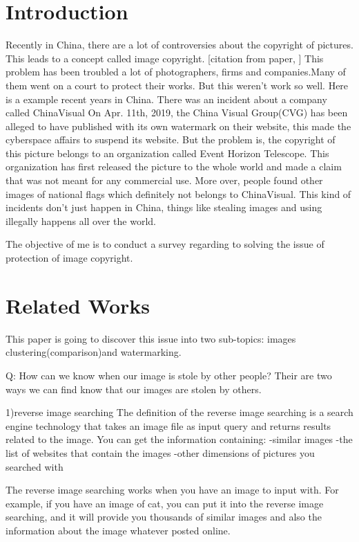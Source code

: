 \section{Introduction}
Recently in China, there are a lot of controversies about the copyright of pictures. This leads to a concept called image copyright. [citation from paper, ]
This problem has been troubled a lot of photographers, firms and companies.Many of them went on a court to protect their works. But this weren't work so well. Here is a example recent years in China.
There was an incident about a company called ChinaVisual
On Apr. 11th, 2019, the China Visual Group(CVG) has been alleged to have published with its own watermark on their website, this made the cyberspace affairs to suspend its website.
But the problem is,
the copyright of this picture belongs to an organization called Event Horizon Telescope. This organization has first released the picture to the whole world and made a claim that was not meant for any commercial use.
More over, people found other images of national flags which definitely not belongs to ChinaVisual.
This kind of incidents don't just happen in China, things like stealing images and using illegally happens all over the world.

The objective of me is to conduct a survey regarding to solving the issue of protection of image copyright.

\section{Related Works}
\begin{comment}


\end{comment}

This paper is going to discover this issue into two sub-topics: images clustering(comparison)and watermarking.

Q: How can we know when our image is stole by other people?
Their are two ways we can find know that our images are stolen by others.

1)reverse image searching
The definition of the reverse image searching is a search engine technology that takes an image file as input query and returns results related to the image.
You can get the information containing:
-similar images
-the list of websites that contain the images
-other dimensions of pictures you searched with

The reverse image searching works when you have an image to input with.
For example, if you have an image of cat,
you can put it into the reverse image searching,
and it will provide you thousands of similar images and also the information about the image whatever posted online.

